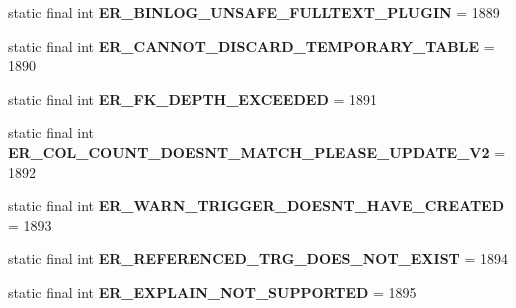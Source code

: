 \begin{DoxyCompactItemize}
static final int {\bfseries E\+R\+\_\+\+B\+I\+N\+L\+O\+G\+\_\+\+U\+N\+S\+A\+F\+E\+\_\+\+F\+U\+L\+L\+T\+E\+X\+T\+\_\+\+P\+L\+U\+G\+IN} = 1889
\item 
\mbox{\label{classcom_1_1mysql_1_1jdbc_1_1_mysql_error_numbers_af2102730064165e660de3f538632c4a5}} 
static final int {\bfseries E\+R\+\_\+\+C\+A\+N\+N\+O\+T\+\_\+\+D\+I\+S\+C\+A\+R\+D\+\_\+\+T\+E\+M\+P\+O\+R\+A\+R\+Y\+\_\+\+T\+A\+B\+LE} = 1890
\item 
\mbox{\label{classcom_1_1mysql_1_1jdbc_1_1_mysql_error_numbers_a98b995f2ffc64f676eef7a9b6127061d}} 
static final int {\bfseries E\+R\+\_\+\+F\+K\+\_\+\+D\+E\+P\+T\+H\+\_\+\+E\+X\+C\+E\+E\+D\+ED} = 1891
\item 
\mbox{\label{classcom_1_1mysql_1_1jdbc_1_1_mysql_error_numbers_ad8e5281eec48197f29e97e9e6baa51c3}} 
static final int {\bfseries E\+R\+\_\+\+C\+O\+L\+\_\+\+C\+O\+U\+N\+T\+\_\+\+D\+O\+E\+S\+N\+T\+\_\+\+M\+A\+T\+C\+H\+\_\+\+P\+L\+E\+A\+S\+E\+\_\+\+U\+P\+D\+A\+T\+E\+\_\+\+V2} = 1892
\item 
\mbox{\label{classcom_1_1mysql_1_1jdbc_1_1_mysql_error_numbers_ab336c404d3bed26dc7168aaa3a84be53}} 
static final int {\bfseries E\+R\+\_\+\+W\+A\+R\+N\+\_\+\+T\+R\+I\+G\+G\+E\+R\+\_\+\+D\+O\+E\+S\+N\+T\+\_\+\+H\+A\+V\+E\+\_\+\+C\+R\+E\+A\+T\+ED} = 1893
\item 
\mbox{\label{classcom_1_1mysql_1_1jdbc_1_1_mysql_error_numbers_ab431191f8d3e5a986f24c835d792061f}} 
static final int {\bfseries E\+R\+\_\+\+R\+E\+F\+E\+R\+E\+N\+C\+E\+D\+\_\+\+T\+R\+G\+\_\+\+D\+O\+E\+S\+\_\+\+N\+O\+T\+\_\+\+E\+X\+I\+ST} = 1894
\item 
\mbox{\label{classcom_1_1mysql_1_1jdbc_1_1_mysql_error_numbers_a68f70d8c249a452a18bb2d106ce6ab4f}} 
static final int {\bfseries E\+R\+\_\+\+E\+X\+P\+L\+A\+I\+N\+\_\+\+N\+O\+T\+\_\+\+S\+U\+P\+P\+O\+R\+T\+ED} = 1895
\item 
\mbox{\label{classcom_1_1mysql_1_1jdbc_1_1_mysql_error_numbers_aff6ef66e308bc6cc33c5159c284e844f}} 

\end{DoxyCompactItemize}
